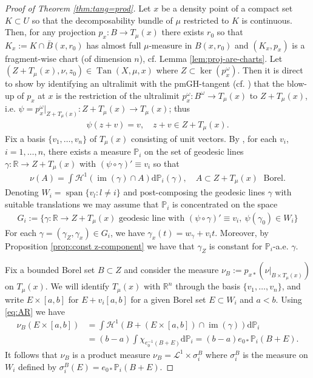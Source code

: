 \documentclass{amsart}
\numberwithin{equation}{section}
\newcommand{\R}{\mathbb{R}}
\renewcommand{\P}{\mathbb{P}}
\newcommand{\Ha}{\mathcal{H}}
\newcommand{\leb}{\mathcal{L}}
\newcommand{\im}{\operatorname{im}}
\newcommand{\ud}{\mathrm {d}}
\newcommand{\inv}{^{-1}}
\newcommand{\Tan}{\operatorname{Tan}}
\begin{document}
\begin{proof}[Proof of Theorem \ref{thm:tang=prod}]
Let $x$ be a density point of a compact set $K\subset U$ so that the decomposability bundle of $\mu$ restricted to $K$ is continuous. Then, for any projection $p_x:B\to T_\mu(x)$ there exists $r_0$ so that $K_x:=K\cap \bar B(x,r_0)$ has almost full $\mu$-measure in $B(x,r_0)$ and $(K_x,p_x)$ is a fragment-wise chart (of dimension $n$), cf. Lemma \ref{lem:proj-are-charts}. Let $(Z+T_\mu(x),\nu,z_0)\in \Tan(X,\mu,x)$ where $Z\subset \ker(p^\omega_x)$. Then it is direct to show by identifying an ultralimit with the pmGH-tangent (cf. \cite[Corollary 9.3]{pasqualettoschultz}) that the blow-up of $p_x$ at $x$ is the restriction of the ultralimit $p_x^\omega:B^\omega\to T_\mu(x)$ to $Z+T_\mu(x)$, i.e. $\psi=p_x^\omega|_{Z+T_\mu(x)}:Z+T_\mu(x)\to T_\mu(x)$; thus 
\begin{align*}
    \psi(z+v)=v,\quad z+v\in Z+T_\mu(x).
\end{align*}
Fix a basis $\{v_1,\ldots,v_n\}$ of $T_\mu(x)$ consisting of unit vectors. By \cite[Corollary 3.14]{sch16a}, for each $v_i$, $i=1,\ldots,n$, there exists a measure $\P_i$ on the set of geodesic lines $\gamma: \R\to Z+T_\mu(x)$ with $(\psi\circ\gamma)'\equiv v_i$ so that 
\begin{align}\label{eq:AR}
\nu(A)=\int \Ha^1(\im(\gamma)\cap A)\ud\P_i(\gamma),\quad A\subset Z+T_\mu(x)\; \mbox{ Borel.}
\end{align}
Denoting $W_i=\operatorname{span}\{v_l: l\ne i\}$ and post-composing the geodesic lines $\gamma$ with suitable translations we may assume that $\P_i$ is concentrated on the space 
\begin{align*}
G_i:=\{\gamma:\R\to Z+T_\mu(x)\mbox{ geodesic line with }(\psi\circ\gamma)'\equiv v_i,\ \psi(\gamma_0)\in W_i\}
\end{align*}
For each $\gamma=(\gamma_Z,\gamma_x)\in G_i$, we have $\gamma_x(t)=w_\gamma+v_it$. Moreover, by Proposition \ref{prop:const z-component} we have that $\gamma_Z$ is constant for $\P_i$-a.e. $\gamma$.


Fix a bounded Borel set $B\subset Z$ and consider the measure $\nu_B:=p_{x\ast}(\nu|_{B\times T_\mu(x)})$ on $T_\mu(x)$. We will identify $T_\mu(x)$ with $\R^n$ through the basis $\{v_1,\ldots,v_n\}$, and write $E\times [a,b]$ for $E+v_i[a,b]$ for a given Borel set $E\subset W_i$ and $a<b$. Using \eqref{eq:AR} we have
\begin{align*}
\nu_B(E\times[a,b])&=\int \Ha^1(B+(E\times [a,b])\cap\im(\gamma))\ud\P_i\\
&=(b-a)\int\chi_{e_0\inv(B+E)}\ud\P_i=(b-a)e_{0\ast}\P_i(B+E).
\end{align*}
It follows that $\nu_B$ is a product measure $\nu_B=\leb^1\times\sigma_i^B$ where $\sigma_i^B$ is the measure on $W_i$ defined by $\sigma_i^B(E)=e_{0\ast}\P_i(B+E)$.


\end{proof}
\end{document}
